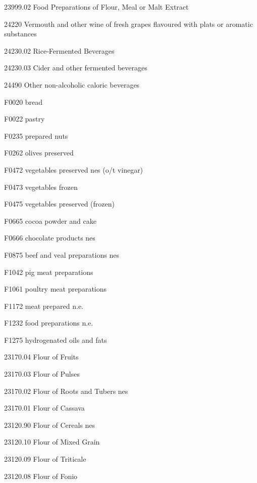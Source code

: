 \documentclass[nojss]{jss}
\begin{document}
\begin{appendices}
\begin{Schunk}
\begin{Soutput}
 23999.02    Food Preparations of Flour,   
                 Meal or Malt Extract      

  24220       Vermouth and other wine of   
             fresh grapes flavoured with   
             plats or aromatic substances  

 24230.02      Rice-Fermented Beverages    

 24230.03     Cider and other fermented    
                      beverages            

  24490      Other non-alcoholic caloric   
                      beverages            

  F0020                 bread              

  F0022                 pastry             

  F0235             prepared nuts          

  F0262            olives preserved        

  F0472     vegetables preserved nes (o/t  
                       vinegar)            

  F0473           vegetables frozen        

  F0475     vegetables preserved (frozen)  

  F0665         cocoa powder and cake      

  F0666         chocolate products nes     

  F0875     beef and veal preparations nes 

  F1042         pig meat preparations      

  F1061       poultry meat preparations    

  F1172           meat prepared n.e.       

  F1232         food preparations n.e.     

  F1275       hydrogenated oils and fats   

 23170.04          Flour of Fruits         

 23170.03          Flour of Pulses         

 23170.02   Flour of Roots and Tubers nes  

 23170.01          Flour of Cassava        

 23120.90        Flour of Cereals nes      

 23120.10        Flour of Mixed Grain      

 23120.09         Flour of Triticale       

 23120.08           Flour of Fonio         


\end{Soutput}
\end{Schunk}
\end{appendices}
\end{document}
